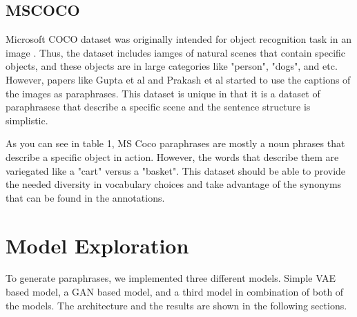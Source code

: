 \documentclass{article}
\begin{document}
\subsection{MSCOCO}
Microsoft COCO dataset was originally intended for object recognition task in an image \cite{lin2014microsoft}. Thus, the dataset includes iamges of natural scenes that contain specific objects, and these objects are in large categories like "person", "dogs", and etc. However, papers like Gupta et al \cite{gupta2017deep} and Prakash et al \cite{prakash-etal-2016-neural} started to use the captions of the images as paraphrases. This dataset is unique in that it is a dataset of paraphrasese that describe a specific scene and the sentence structure is simplistic. 

As you can see in table 1, MS Coco paraphrases are mostly a noun phrases that describe a specific object in action. However, the words that describe them are variegated like a "cart" versus a "basket". This dataset should be able to provide the needed diversity in vocabulary choices and take advantage of the synonyms that can be found in the annotations.

\section{Model Exploration}
To generate paraphrases, we implemented three different models. Simple VAE based model, a GAN based model, and a third model in combination of both of the models. The architecture and the results are shown in the following sections.
\end{document}
